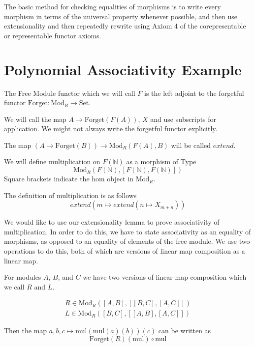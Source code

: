 \documentclass[12pt]{article} %
\theoremstyle{definition}
\theoremstyle{definition}
\theoremstyle{definition}
\theoremstyle{definition}
\begin{document}
The basic method for checking equalities of morphisms is to write every morphism in terms of 
the universal property whenever possible, and then use extensionality and then repeatedly 
rewrite using Axiom 4 of the corepresentable or representable functor axioms.

\section{Polynomial Associativity Example}

The Free Module functor which we will call $F$ is the left adjoint to the forgetful 
functor $\text{Forget} : \text{Mod}_R \to \text{Set}$.

We will call the map $A \to \text{Forget}(F(A))$, $X$ and use subscripts for application.
We might not always write the forgetful functor explicitly.

The map $(A \to \text{Forget}(B)) \to {\text{Mod}_R}(F(A), B)$ will be called $extend$.

We will define multiplication on $F(\mathbb{N})$ as a morphism of Type 
\begin{equation}
  \text{Mod}_R(F(\mathbb{N}), [F(\mathbb{N}), F(\mathbb{N})])
\end{equation} 
Square brackets indicate the hom object in $\text{Mod}_R$.

The definition of multiplication is as follows
\begin{equation}
  extend (m \mapsto extend (n \mapsto X_{m + n}))
\end{equation}

We would like to use our extensionality lemma to prove associativity of multiplication.
In order to do this, we have to state associativity as an equality of morphisms,
as opposed to an equality of elements of the free module. We use two operations
to do this, both of which are versions of linear map composition as a linear map.

For modules $A$, $B$, and $C$ we have two versions of linear map 
composition which we call $R$ and $L$.

\begin{equation}
  \begin{aligned}
    R \in \text{Mod}_R([A, B], [[B,C],[A,C]]) \\
     L \in \text{Mod}_R([B, C], [[A,B],[A,C]])
  \end{aligned}
\end{equation}

Then the map $a, b, c \mapsto \text{mul} (\text{mul} (a)(b))(c)$ can be written as 
\begin{equation}
  \text{Forget}(R)(\text{mul}) \circ \text{mul}
\end{equation}
\end{document}
